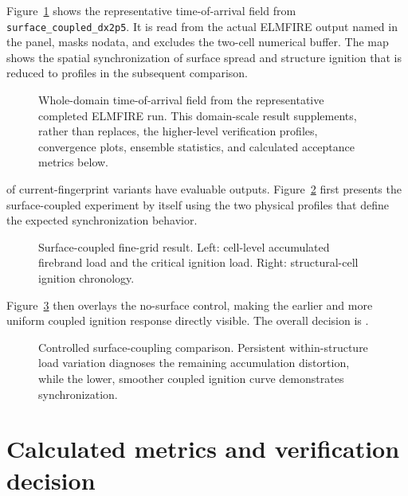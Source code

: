 Figure~\ref{fig:domain-result} shows the representative time-of-arrival field from \texttt{surface\_coupled\_dx2p5}.
It is read from the actual ELMFIRE output named in the panel, masks nodata, and excludes
the two-cell numerical buffer.  The map shows the spatial synchronization of surface spread and structure ignition that is reduced to profiles in the subsequent comparison.

\begin{figure}[H]
\centering
{}
\caption{Whole-domain time-of-arrival field from the representative completed ELMFIRE run.  This
domain-scale result supplements, rather than replaces, the higher-level verification
profiles, convergence plots, ensemble statistics, and calculated acceptance metrics below.}
\label{fig:domain-result}
\end{figure}


\CompletedVariantCount{} of \RequestedVariantCount{} current-fingerprint
variants have evaluable outputs. Figure~\ref{fig:wsc-reference} first presents
the surface-coupled experiment by itself using the two physical profiles that
define the expected synchronization behavior.

\begin{figure}[H]
\centering
{}
\caption{Surface-coupled fine-grid result. Left: cell-level accumulated
firebrand load and the critical ignition load. Right: structural-cell ignition
chronology.}
\label{fig:wsc-reference}
\end{figure}

Figure~\ref{fig:wsc-comparison} then overlays the no-surface control, making the
earlier and more uniform coupled ignition response directly visible. The
overall decision is \textbf{\OverallStatus}.

\begin{figure}[H]
\centering
{}
\caption{Controlled surface-coupling comparison. Persistent within-structure
load variation diagnoses the remaining accumulation distortion, while the
lower, smoother coupled ignition curve demonstrates synchronization.}
\label{fig:wsc-comparison}
\end{figure}

\section{Calculated metrics and verification decision}

